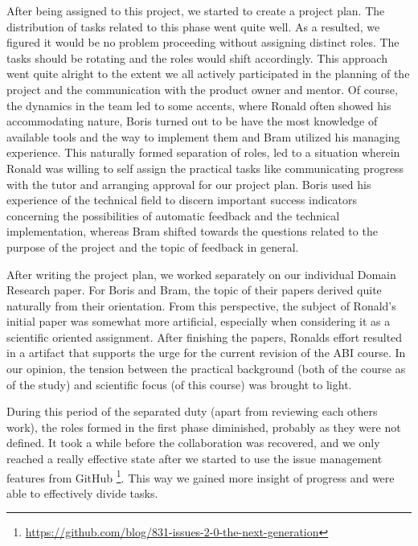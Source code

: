 After being assigned to this project, we started to create a project plan.
The distribution of tasks related to this phase went quite well. As a resulted,
we figured it would be no problem proceeding without assigning distinct
roles. The tasks should be rotating and the roles would shift accordingly.
This approach went quite alright to the extent we all actively participated in
the planning of the project and the communication with the product owner and 
mentor. Of course, the dynamics in the team led to some accents, where Ronald
often showed his accommodating nature, Boris turned out to be have the most
knowledge of available tools and the way to implement them and Bram utilized
his managing experience. This naturally formed separation of roles, led to a
situation wherein Ronald was willing to self assign the practical tasks like 
communicating progress with the tutor and arranging approval for our project 
plan. Boris used his experience of the technical field
to discern important success indicators concerning the possibilities of 
automatic feedback and the technical implementation,
whereas Bram shifted towards the questions related to the purpose of the project
and the topic of feedback in general. 

After writing the project plan, we worked separately on our individual Domain
Research paper. For Boris and Bram, the topic of their papers derived quite 
naturally from their orientation. From this perspective, the subject
of Ronald's initial paper was somewhat more artificial, especially
when considering it as a scientific oriented assignment. After finishing the 
papers, Ronalds effort resulted in a artifact that supports the urge for the
current revision of the ABI course. In our opinion, the tension
between the practical background (both of the course as of the study) and 
scientific focus (of this course) was brought to light. 

During this period of the separated duty (apart from reviewing each others 
work), the roles formed in the first phase diminished, probably as they were not 
defined. It took a while before the 
collaboration was recovered, and we only reached a really effective state after
we started to use the issue management features from GitHub
\footnote{\url{https://github.com/blog/831-issues-2-0-the-next-generation}}.
This way we gained more insight of progress and were able to effectively divide
tasks. 

